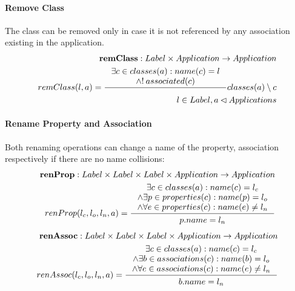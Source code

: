 \documentclass[11pt]{article}
\begin{document}
\paragraph{Remove Class} The class can be removed only in case it is not referenced by any association existing in the application.
\begin{align*}
	\mathbf{remClass} : Label \times Application \rightarrow Application \\
	remClass(l, a) = \inference{\exists c \in classes(a) : name(c) = l \\ \wedge !\: associated(c)
	} {classes(a) \setminus c }\\
	l \in Label,a \lhd Applications
\end{align*}

\paragraph{Rename Property and Association} Both renaming operations can change a name of the property, association respectively if there are no name collisions:
\begin{align*}
	\mathbf{renProp} : Label \times Label \times Label \times Application \rightarrow Application \\
	renProp(l_c, l_o, l_n, a) = \inference{\exists c \in classes(a) : name(c) = l_c \\ \wedge \exists p \in properties(c) : name(p) = l_o \\ \wedge \forall e \in properties(c) : name(e) \neq l_n
	}{\begin{gathered}
		p.name = l_n 
	\end{gathered}}
\end{align*}
\begin{align*}
	\mathbf{renAssoc} : Label \times Label \times Label \times Application \rightarrow Application \\
	renAssoc(l_c, l_o, l_n, a) = \inference{\exists c \in classes(a) : name(c) = l_c \\ \wedge \exists b \in associations(c) : name(b) = l_o \\ \wedge \forall e \in associations(c) : name(e) \neq l_n
	}{\begin{gathered}
		b.name = l_n 
	\end{gathered}}
\end{align*}
\end{document}
